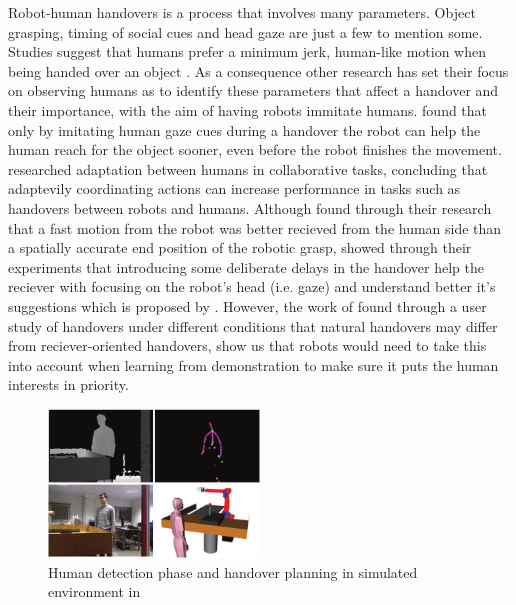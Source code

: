 Robot-human handovers is a process that involves many parameters. Object grasping, timing of social cues and head gaze are just a few to mention some. Studies suggest that humans prefer a minimum jerk, human-like motion when being handed over an object \parencite{Huber2008} \parencite{Huber2008a}. As a consequence other research has set their focus on observing humans as to identify these parameters that affect a handover and their importance, with the aim of having robots immitate humans. \textcite{Moon2014} found that only by imitating human gaze cues during a handover the robot can help the human reach for the object sooner, even before the robot finishes the movement. \textcite{Huang2015} researched adaptation between humans in collaborative tasks, concluding that adaptevily coordinating actions can increase performance in tasks such as handovers between robots and humans. Although \textcite{Koene2014} found through their research that a fast motion from the robot was better recieved from the human side than a spatially accurate end position of the robotic grasp, \textcite{Admoni2014} showed through their experiments that introducing some deliberate delays in the handover help the reciever with focusing on the robot's head (i.e. gaze) and understand better it's suggestions which is proposed by \parencite{Moon2014}. However, the work of \textcite{Chan2015} found through a user study of handovers under different conditions that natural handovers may differ from reciever-oriented handovers, show us that robots would need to take this into account when learning from demonstration to make sure it puts the human interests in priority.

\begin{figure}
	\centering
	\includegraphics[width=0.5\textwidth]{img/related-work/planning-simulation.png}
	\caption{Human detection phase and handover planning in simulated environment in \parencite{Aleotti2012}}
\end{figure}

